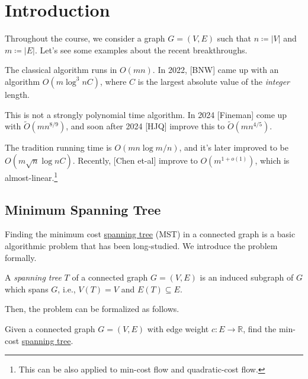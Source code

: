 \chapter{Introduction}
Throughout the course, we consider a graph \(G=(V, E)\) such that \(n \coloneqq \lvert V \rvert \) and \(m\coloneqq \lvert E \rvert \). Let's see some examples about the recent breakthroughs.

\begin{eg}
	The classical algorithm runs in \(O(mn)\). In 2022, [BNW] came up with an algorithm \(O(m \log ^3 n C)\), where \(C\) is the largest absolute value of the \emph{integer} length.

	This is not a strongly polynomial time algorithm. In 2024 [Fineman] come up with \(\widetilde{O} (m n^{8 / 9})\), and soon after 2024 [HJQ] improve this to \(\widetilde{O} (m n^{4 / 5})\).
\end{eg}

\begin{eg}
	The tradition running time is \(O(mn \log m / n)\), and it's later improved to be \(O(m \sqrt{n} \log n C)\). Recently, [Chen et-al] improve to \(O(m^{1 + o(1)})\), which is almost-linear.\footnote{This can be also applied to min-cost flow and quadratic-cost flow.}
\end{eg}

\section{Minimum Spanning Tree}
Finding the minimum cost \hyperref[def:spanning-tree]{spanning tree} (MST) in a connected graph is a basic algorithmic problem that has been long-studied. We introduce the problem formally.

\begin{definition}\label{def:spanning-tree}
	A \emph{spanning tree} \(T\) of a connected graph \(G =(V, E)\) is an induced subgraph of \(G\) which spans \(G\), i.e., \(V(T) = V\) and \(E(T) \subseteq E\).
\end{definition}

Then, the problem can be formalized as follows.

\begin{problem}\label{prb:MST}
Given a connected graph \(G=(V, E)\) with edge weight \(c \colon E \to \mathbb{R} \), find the min-cost \hyperref[def:spanning-tree]{spanning tree}.
\end{problem}

